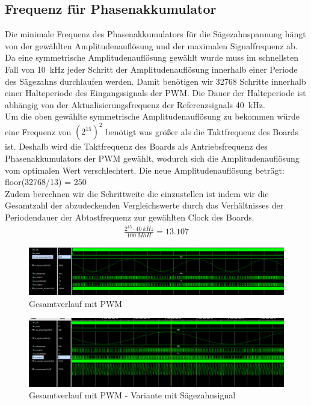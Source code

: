 \documentclass[a4paper,11pt,DIV=11,parskip=half]{scrartcl}
\begin{document}
\subsection{Frequenz für Phasenakkumulator}
Die minimale Frequenz des Phasenakkumulators für die Sägezahnspannung hängt von der gewählten Amplitudenauflösung und der maximalen Signalfrequenz ab. \\
Da eine symmetrische Amplitudenauflösung gewählt wurde muss im schnellsten Fall von \SI{10}{kHz} jeder Schritt der Amplitudenauflösung innerhalb einer Periode des Sägezahns durchlaufen werden.
Damit benötigen wir 32768 Schritte innerhalb einer Halteperiode des Eingangssignals der PWM. Die Dauer der Halteperiode ist abhängig von der Aktualisierungsfrequenz der Referenzsignals \SI{40}{kHz}. \\ Um die oben gewählte symmetrische Amplitudenauflösung zu bekommen würde eine Frequenz von $(2^{15})^2$ benötigt was größer als die Taktfrequenz des Boards ist. Deshalb wird die Taktfrequenz des Boards als Antriebsfrequenz des Phasenakkumulators der PWM gewählt, wodurch sich die Amplitudenauflösung vom optimalen Wert verschlechtert. 
Die neue Amplitudenauflösung beträgt: floor(32768/13) = 250 \\
Zudem berechnen wir die Schrittweite die einzustellen ist indem wir die Gesamtzahl der abzudeckenden Vergleichswerte durch das Verhältnisses der Periodendauer der Abtastfrequenz zur gewählten Clock des Boards.
\begin{align}
	\frac{2^{15}\cdot \SI{40}{kHz}}{\SI{100}{MhH}} = 13.107
\end{align}
\begin{figure}[H]
	\centering
	\includegraphics[width=\textwidth]{Bilder/DDS_FULL_PWM.png}
	\caption{Gesamtverlauf mit PWM}
	\label{fig:tb_DDS_PWM}
\end{figure}
\begin{figure}[H]
	\centering
	\includegraphics[width=\textwidth]{Bilder/DDS_FULL_PWM2.png}
	\caption{Gesamtverlauf mit PWM - Variante mit Sägezahnsignal}
	\label{fig:tb_DDS_PWM2}
\end{figure}
\end{document}
